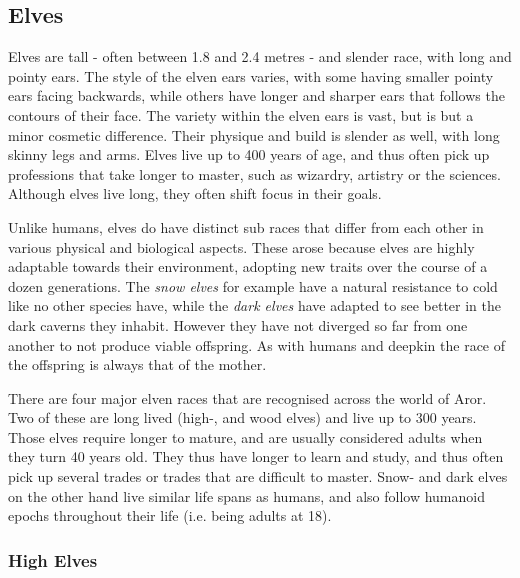 \subsection{Elves}
\label{sec:Elves}

Elves are tall - often between 1.8 and 2.4 metres - and slender race, with
long and pointy ears. The style of the elven ears varies, with some having
smaller pointy ears facing backwards, while others have longer and sharper
ears that follows the contours of their face. The variety within the elven
ears is vast, but is but a minor cosmetic difference. Their physique and build
is slender as well, with long skinny legs and arms. Elves live up to 400 years
of age, and thus often pick up professions that take longer to master, such as
wizardry, artistry or the sciences. Although elves live long, they often shift
focus in their goals.

Unlike humans, elves do have distinct sub races that differ from each other in
various physical and biological aspects. These arose because elves are highly
adaptable towards their environment, adopting new traits over the course of a
dozen generations. The \emph{snow elves} for example have a natural resistance
to cold like no other species have, while the \emph{dark elves} have adapted
to see better in the dark caverns they inhabit. However they have not diverged
so far from one another to not produce viable offspring. As with humans and
deepkin the race of the offspring is always that of the mother.



There are four major elven races that are recognised across the world of Aror.
Two of these are long lived (high-, and wood elves) and live up to 300
years. Those elves require longer to mature, and are usually considered adults
when they turn 40 years old. They thus have longer to learn and study, and
thus often pick up several trades or trades that are difficult to master.
Snow- and dark elves on the other hand live similar life spans as humans, and
also follow humanoid epochs throughout their life (i.e. being adults at 18).

\subsubsection{High Elves}
\label{sec:High Elves}

